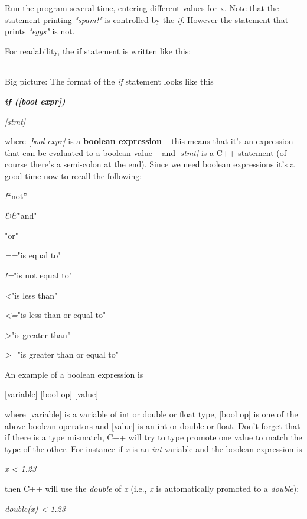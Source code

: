 \documentclass[
]{article}
\begin{document}
Run the program several time, entering different values for x. Note that
the statement printing \emph{"spam!"} is controlled by the \emph{if}.
However the statement that prints \emph{"eggs"} is not.

For readability, the if statement is written like this:

\begin{longtable}[]{@{}@{}}
\toprule
\endhead
\bottomrule
\end{longtable}

Big picture: The format of the \emph{if} statement looks like this

\emph{\textbf{if (}\textbf{{[}bool expr{]}}\textbf{)}}

\emph{{[}stmt{]}}

where {[}\emph{bool expr{]}} is a \textbf{boolean expression} -- this
means that it's an expression that can be evaluated to a boolean value
-- and {[}\emph{stmt{]} }is a C++ statement (of course there's a
semi-colon at the end). Since we need boolean expressions it's a good
time now to recall the following:

\emph{!}``not''

\emph{\&\&}"and"

\emph{\textbar\textbar{}}"or"

\emph{==}"is equal to"

\emph{!=}"is not equal to"

\emph{\textless{}}"is less than"

\emph{\textless=}"is less than or equal to"

\emph{\textgreater{}}"is greater than"

\emph{\textgreater=}"is greater than or equal to"

An example of a boolean expression is

{[}variable{]} {[}bool op{]} {[}value{]}

where {[}variable{]} is a variable of int or double or float type,
{[}bool op{]} is one of the above boolean operators and {[}value{]} is
an int or double or float. Don't forget that if there is a type
mismatch, C++ will try to type promote one value to match the type of
the other. For instance if \emph{x} is an \emph{int} variable and the
boolean expression is

\emph{x \textless{} 1.23}

then C++ will use the \emph{double} of \emph{x} (i.e., \emph{x} is
automatically promoted to a \emph{double}):

\emph{double(x) \textless{} 1.23}
\end{document}

